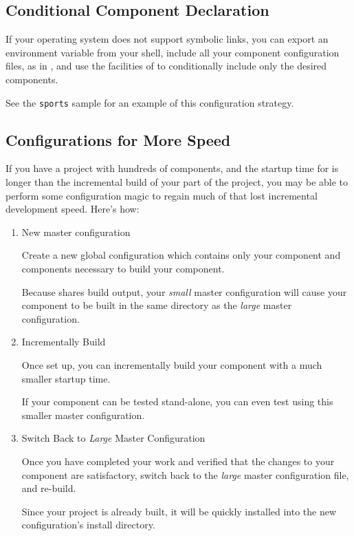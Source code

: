 \subsection{Conditional Component Declaration}

If your operating system does not support symbolic links, you can
export an environment variable from your shell, include all your
component configuration files, as in , and use
the facilities of \gnumake to conditionally include only the desired
components.

See the \texttt{sports} sample for an example of this configuration
strategy.

\subsection{Configurations for More Speed}

If you have a project with hundreds of components, and the startup
time for \lmsbw is longer than the incremental build of your part of
the project, you may be able to perform some configuration magic to
regain much of that lost incremental development speed.  Here's how:

\begin{enumerate}
\item New master configuration

  Create a new global configuration which contains only your component
  and components necessary to build your component.

  Because \lmsbw shares build output, your \emph{small} master
  configuration will cause your component to be built in the same
  directory as the \emph{large} master configuration.

\item Incrementally Build

  Once set up, you can incrementally build your component with a much
  smaller startup time.

  If your component can be tested stand-alone, you can even test using
  this smaller master configuration.

\item Switch Back to \emph{Large} Master Configuration

  Once you have completed your work and verified that the changes to
  your component are satisfactory, switch back to the \emph{large}
  master configuration file, and re-build.

  Since your project is already built, it will be quickly installed
  into the new configuration's install directory.

\end{enumerate}

